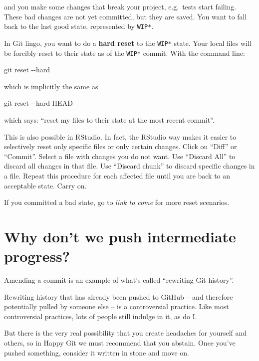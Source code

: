 \documentclass[
]{book}
\newenvironment{Shaded}{\begin{snugshade}}{\end{snugshade}}
\newcommand{\NormalTok}[1]{#1}
\begin{document}
and you make some changes that break your project, e.g.~tests start failing.
These bad changes are not yet committed, but they are saved.
You want to fall back to the last good state, represented by \texttt{WIP*}.

In Git lingo, you want to do a \textbf{hard reset} to the \texttt{WIP*} state.
Your local files will be forcibly reset to their state as of the \texttt{WIP*} commit.
With the command line:

\begin{Shaded}
\begin{Highlighting}[]
\NormalTok{git reset {-}{-}hard}
\end{Highlighting}
\end{Shaded}

which is implicitly the same as

\begin{Shaded}
\begin{Highlighting}[]
\NormalTok{git reset {-}{-}hard HEAD}
\end{Highlighting}
\end{Shaded}

which says: ``reset my files to their state at the most recent commit''.

This is also possible in RStudio.
In fact, the RStudio way makes it easier to selectively reset only specific files or only certain changes.
Click on ``Diff'' or ``Commit''.
Select a file with changes you do not want.
Use ``Discard All'' to discard all changes in that file.
Use ``Discard chunk'' to discard specific changes in a file.
Repeat this procedure for each affected file until you are back to an acceptable state.
Carry on.

If you committed a bad state, go to \emph{link to come} for more reset scenarios.

\section{Why don't we push intermediate progress?}\label{why-dont-we-push-intermediate-progress}

Amending a commit is an example of what's called ``rewriting Git history''.

Rewriting history that has already been pushed to GitHub -- and therefore potentially pulled by someone else -- is a controversial practice.
Like most controversial practices, lots of people still indulge in it, as do I.

But there is the very real possibility that you create headaches for yourself and others, so in Happy Git we must recommend that you abstain.
Once you've pushed something, consider it written in stone and move on.
\end{document}
